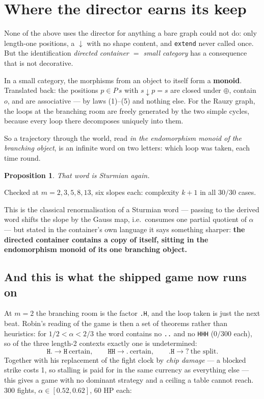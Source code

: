 \documentclass[11pt,a4paper]{article}
\theoremstyle{definition}
\theoremstyle{plain}
\newtheorem{proposition}[definition]{Proposition}
\theoremstyle{remark}
\begin{document}
\section{Where the director earns its keep}\label{sec:endo}

None of the above uses the director for anything a bare graph could not do: only
length-one positions, a $\downarrow$ with no shape content, and
\texttt{extend} never called once. But the identification
\emph{directed container $=$ small category} has a consequence that is not
decorative.

In a small category, the morphisms from an object to itself form a
\textbf{monoid}. Translated back: the positions $p \in P\,s$ with
$s \downarrow p = s$ are closed under $\oplus$, contain $o$, and are associative
--- by laws (1)--(5) and nothing else. For the Rauzy graph, the loops at the
branching room are freely generated by the two simple cycles, because every loop
there decomposes uniquely into them.

So a trajectory through the world, read \emph{in the endomorphism monoid of the
branching object}, is an infinite word on two letters: which loop was taken,
each time round.

\begin{proposition}
That word is Sturmian again.
\end{proposition}

Checked at $m = 2, 3, 5, 8, 13$, six slopes each: complexity $k+1$ in all
$30/30$ cases.

This is the classical renormalisation of a Sturmian word --- passing to the
derived word shifts the slope by the Gauss map, i.e.\ consumes one partial
quotient of $\alpha$ --- but stated in the container's own language it says
something sharper: \textbf{the directed container contains a copy of itself,
sitting in the endomorphism monoid of its one branching object.}

\subsection{And this is what the shipped game now runs on}

At $m = 2$ the branching room is the factor \texttt{.H}, and the loop taken is
just the next beat. Robin's reading of the game is then a set of theorems rather
than heuristics: for $1/2 < \alpha < 2/3$ the word contains no \texttt{..} and
no \texttt{HHH} ($0/300$ each), so of the three length-2 contexts exactly one is
undetermined:
\[
  \texttt{H.} \to \texttt{H} \ \text{certain},
  \qquad
  \texttt{HH} \to \texttt{.} \ \text{certain},
  \qquad
  \texttt{.H} \to \texttt{?} \ \text{the split.}
\]
Together with his replacement of the fight clock by \emph{chip damage} --- a
blocked strike costs 1, so stalling is paid for in the same currency as
everything else --- this gives a game with no dominant strategy and a ceiling a
table cannot reach. 300 fights, $\alpha \in [0.52, 0.62]$, 60 HP each:
\end{document}
